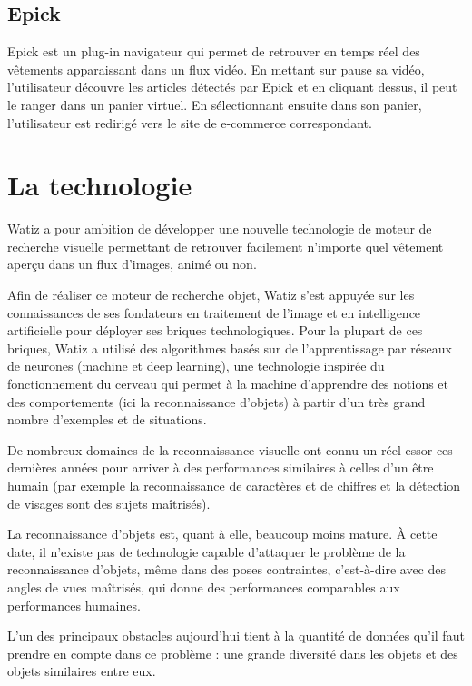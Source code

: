 \documentclass[a4paper, 12pt]{report}
\begin{document}
\subsection{Epick}
Epick est un plug-in navigateur qui permet de retrouver en temps réel des vêtements apparaissant dans un flux vidéo. En mettant sur pause sa vidéo, l’utilisateur découvre les articles détectés par Epick et en cliquant dessus, il peut le ranger dans un panier virtuel. En sélectionnant ensuite dans son panier, l’utilisateur est redirigé vers le site de e-commerce correspondant.
\section{La technologie}\label{sec:technologie}
Watiz a pour ambition de développer une nouvelle technologie de moteur de recherche visuelle permettant de retrouver facilement n’importe quel vêtement aperçu dans un flux d’images, animé ou non.

Afin de réaliser ce moteur de recherche objet, Watiz s’est appuyée sur les connaissances de ses fondateurs en traitement de l’image et en intelligence artificielle pour déployer ses briques technologiques. Pour la plupart de ces briques, Watiz a utilisé des algorithmes basés sur de l’apprentissage par réseaux de neurones (machine et deep learning), une technologie inspirée du fonctionnement du cerveau qui permet à la machine d'apprendre des notions et des comportements (ici la reconnaissance d'objets) à partir d'un très grand nombre d’exemples et de situations.

De nombreux domaines de la reconnaissance visuelle ont connu un réel essor ces dernières années pour arriver à des performances similaires à celles d’un être humain (par exemple la reconnaissance de caractères et de chiffres et la détection de visages sont des sujets maîtrisés).

La reconnaissance d’objets est, quant à elle, beaucoup moins mature. À cette date, il n’existe pas de technologie capable d’attaquer le problème de la reconnaissance d’objets, même dans des poses contraintes, c’est-à-dire avec des angles de vues maîtrisés, qui donne des performances comparables aux performances humaines.

L’un des principaux obstacles aujourd’hui tient à la quantité de données qu’il faut prendre en compte dans ce problème : une grande diversité dans les objets et des objets similaires entre eux.
\end{document}
